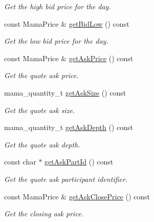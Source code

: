 \begin{CompactItemize}
\begin{CompactList}\small\item\em Get the high bid price for the day. \item\end{CompactList}\item 
const Mama\-Price \& \hyperlink{classWombat_1_1MamdaQuoteListener_8e61cef3c5d211789ec168c0d8866f18}{get\-Bid\-Low} () const 
\begin{CompactList}\small\item\em Get the low bid price for the day. \item\end{CompactList}\item 
const Mama\-Price \& \hyperlink{classWombat_1_1MamdaQuoteListener_b4c49376d3d07db48065adc6d74da196}{get\-Ask\-Price} () const 
\begin{CompactList}\small\item\em Get the quote ask price. \item\end{CompactList}\item 
mama\_\-quantity\_\-t \hyperlink{classWombat_1_1MamdaQuoteListener_4808439461507148c55e678a3dffbb5d}{get\-Ask\-Size} () const 
\begin{CompactList}\small\item\em Get the quote ask size. \item\end{CompactList}\item 
mama\_\-quantity\_\-t \hyperlink{classWombat_1_1MamdaQuoteListener_4bc38582299115bc9d45411e4fabc76d}{get\-Ask\-Depth} () const 
\begin{CompactList}\small\item\em Get the quote ask depth. \item\end{CompactList}\item 
const char $\ast$ \hyperlink{classWombat_1_1MamdaQuoteListener_b8a1c5463eb9ebf89fc402c32e2c81c7}{get\-Ask\-Part\-Id} () const 
\begin{CompactList}\small\item\em Get the quote ask participant identifier. \item\end{CompactList}\item 
const Mama\-Price \& \hyperlink{classWombat_1_1MamdaQuoteListener_1c6e2936fa8677578ee30e6a50ee29bf}{get\-Ask\-Close\-Price} () const 
\begin{CompactList}\small\item\em Get the closing ask price. \item\end{CompactList}\item 

\end{CompactItemize}
